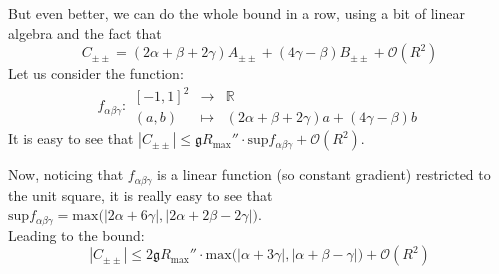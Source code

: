 \documentclass[a4paper,11pt]{article}
\numberwithin{equation}{section}
\theoremstyle{definition}
\begin{document}
But even better, we can do the whole bound in a row, using a bit of linear algebra and the fact that
$$
C_{\pm\pm} = (2\alpha + \beta + 2 \gamma) A_{\pm\pm} + (4\gamma - \beta) B_{\pm\pm}
+ \mathcal{O}(R^2)$$
Let us consider the function:
$$f_{\alpha\beta\gamma}: 
\begin{matrix}
    [-1, 1]^2 & \to & \mathbb{R}\\
    (a,b) & \mapsto & (2\alpha + \beta + 2 \gamma) a + (4\gamma - \beta) b
\end{matrix}$$
It is easy to see that $|C_{\pm\pm}| \leq \mathfrak{g} R_\mathrm{max}'' \cdot \mathrm{sup} f_{\alpha\beta\gamma}+ \mathcal{O}(R^2)$.

Now, noticing that $f_{\alpha\beta\gamma}$ is a linear function (so constant gradient) restricted to the unit square, it is really easy to see that $\mathrm{sup}f_{\alpha\beta\gamma} = \mathrm{max} \big( |2\alpha + 6 \gamma|, |2\alpha + 2\beta - 2 \gamma|\big)$.\\
Leading to the bound:
\begin{equation}
    \boxed{\boxed{ |C_{\pm\pm}| \leq 2 \mathfrak{g} R_\mathrm{max}'' \cdot \mathrm{max}\Big( |\alpha + 3 \gamma|, |\alpha+\beta-\gamma|\Big)+ \mathcal{O}(R^2)}}
\end{equation}
\end{document}
